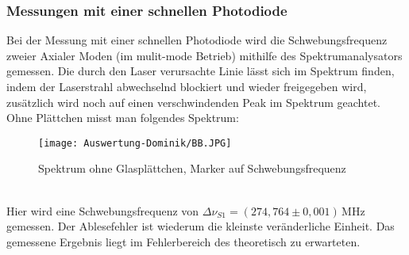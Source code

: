 \subsubsection{Messungen mit einer schnellen Photodiode}
Bei der Messung mit einer schnellen Photodiode wird die Schwebungsfrequenz zweier Axialer Moden (im mulit-mode Betrieb) mithilfe des Spektrumanalysators gemessen.
Die durch den Laser verursachte Linie lässt sich im Spektrum finden, indem der Laserstrahl abwechselnd blockiert und wieder freigegeben wird, zusätzlich wird noch auf einen verschwindenden Peak im Spektrum geachtet.\\
Ohne Plättchen misst man folgendes Spektrum:
\begin{figure}[h]
    \centering\texttt{[image: Auswertung-Dominik/BB.JPG]}
    \caption{Spektrum ohne Glasplättchen, Marker auf Schwebungsfrequenz}
\end{figure}\\
Hier wird eine Schwebungsfrequenz von $\Delta\nu_{S1}=\left(274,764\pm0,001\right)\,\text{MHz}$ gemessen.
Der Ablesefehler ist wiederum die kleinste veränderliche Einheit. %
Das gemessene Ergebnis liegt im Fehlerbereich des theoretisch zu erwarteten.\\

